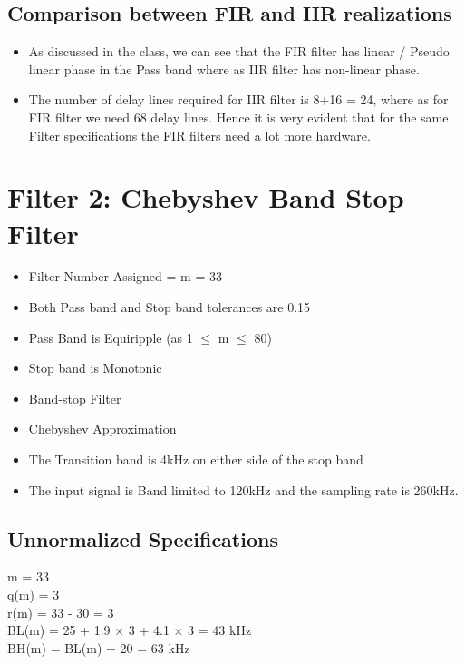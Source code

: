 \documentclass[12pt]{article}
\begin{document}
	\color{cyan}
	\subsection{Comparison between FIR and IIR realizations}
	\color{black}
	\begin{itemize}
		\item As discussed in the class, we can see that the FIR filter has linear / Pseudo linear phase in the Pass band where as IIR filter has non-linear phase.
		\item The number of delay lines required for IIR filter is 8+16 = 24, where as for FIR filter we need 68 delay lines.  Hence it is very evident that for the same Filter specifications the FIR filters need a lot more hardware. 
	\end{itemize}
	

	  
	
	
	\newpage
	\color{darkblue}
	\section{Filter 2: Chebyshev Band Stop Filter}
	\color{black}
	\begin{itemize}
		\item Filter Number Assigned = m = 33
		\item Both Pass band and Stop band tolerances are 0.15
		\item Pass Band is Equiripple (as 1 $\le$ m $\le$ 80)
		\item Stop band is Monotonic 
		\item Band-stop Filter
		\item Chebyshev Approximation
		\item The Transition band is 4kHz on either side of the stop band
		\item The input signal is Band limited to 120kHz and the sampling rate is 260kHz.
	\end{itemize}
	\color{cyan}
	\subsection{Unnormalized Specifications}
	\color{black}
	m = 33\\
	q(m) = 3\\
	r(m) = 33 - 30 = 3\\
	BL(m) = 25 + 1.9 $\times$ 3 + 4.1 $\times$ 3 = 43 kHz\\
	BH(m) = BL(m) + 20 = 63 kHz\\
	
\end{document}
